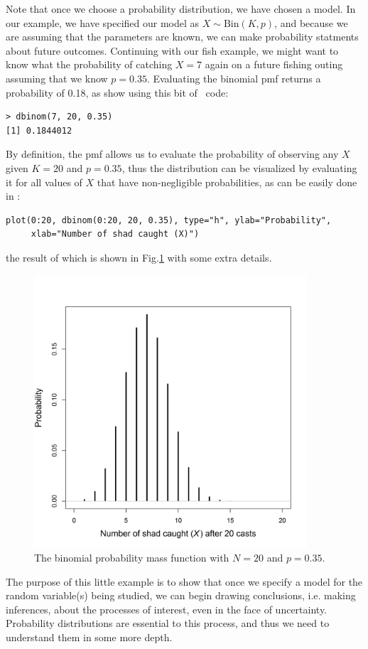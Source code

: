 Note that once we choose a probability distribution, we have chosen a
model. In our example, we have specified our model as $X \sim
\text{Bin}(K,p)$, and because we are assuming that the parameters are
known, we can make probability statments about future
outcomes. Continuing with our fish example, we might want to know what
the probability of catching $X=7$ again on a future fishing outing
assuming that we know $p=0.35$. Evaluating the binomial pmf returns a
probability of 0.18, as show using this bit of \R~code:
\begin{verbatim}
> dbinom(7, 20, 0.35)
[1] 0.1844012
\end{verbatim}
By definition, the pmf allows us to evaluate the probability of observing
any $X$ given $K=20$ and $p=0.35$, thus the distribution %
can be visualized by evaluating it for all values of $X$ that have
non-negligible probabilities, as can be easily done in \R:
\begin{verbatim}
plot(0:20, dbinom(0:20, 20, 0.35), type="h", ylab="Probability",
     xlab="Number of shad caught (X)")
\end{verbatim}
the result of which is shown in Fig.\ref{modeling.fig.bin} with some extra details.
\begin{figure}[ht!]
  \centering
  \includegraphics[width=4in,height=4in]{Ch1b/figs/bin}
\caption{The binomial probability mass function with $N=20$ and
  $p=0.35$. }
\label{modeling.fig.bin}
\end{figure}

The purpose of this little example is to show that once we specify a
model for the random variable(s) being studied, we can begin drawing
conclusions, i.e. making inferences, about the processes of interest,
even in the face of uncertainty. Probability distributions are
essential to this process, and thus we need to
understand them in some more depth.



